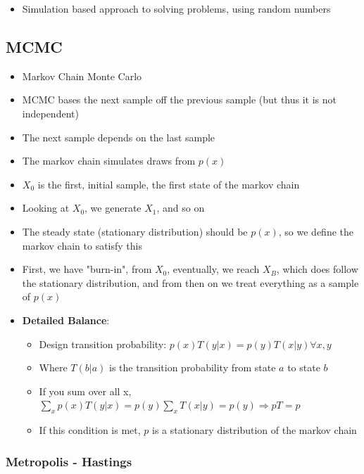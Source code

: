 \documentclass{article}
\begin{document}
\begin{itemize}
    \item Simulation based approach to solving problems, using random numbers
\end{itemize}

\subsection{MCMC}

\begin{itemize}
    \item Markov Chain Monte Carlo
    \item MCMC bases the next sample off the previous sample (but thus it is not independent)
    \item The next sample depends on the last sample
    \item The markov chain simulates draws from $p(x)$
    \item $X_0$ is the first, initial sample, the first state of the markov chain
    \item Looking at $X_0$, we generate $X_1$, and so on
    \item The steady state (stationary distribution) should be $p(x)$, so we define the markov chain to satisfy this
    \item First, we have "burn-in", from $X_0$, eventually, we reach $X_B$, which does follow the stationary distribution, and from then on we treat everything as a sample of $p(x)$
    \item \textbf{Detailed Balance}:
    \begin{itemize}
        \item Design transition probability: $p(x)T(y|x)=p(y)T(x|y) \forall x,y$
        \item Where $T(b|a)$ is the transition probability from state $a$ to state $b$
        \item If you sum over all x, $\sum_{x} p(x)T(y|x)=p(y)\sum_x T(x|y)=p(y) \Rightarrow pT=p$
        \item If this condition is met, $p$ is a stationary distribution of the markov chain
    \end{itemize}
\end{itemize}

\subsubsection{Metropolis - Hastings}
\end{document}
